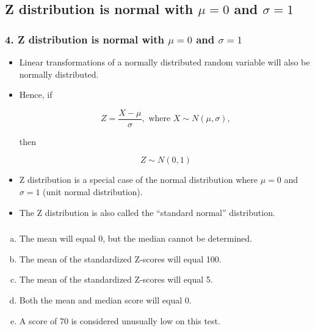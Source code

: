 \documentclass[11pt,containsverbatim,handout,xcolor=xelatex,dvipsnames,table]{beamer}
\newcommand{\solnMult}[1]{#1}
\begin{document}
\subsection{Z distribution is normal with $\mu = 0$ and $\sigma = 1$}
\label{mi4}


\begin{frame}
\frametitle{4. Z distribution is normal with $\mu = 0$ and $\sigma = 1$}

\begin{itemize}

\item Linear transformations of a normally distributed random variable will also be normally 
distributed.

\pause

\item Hence, if

\[ Z = \frac{X - \mu}{\sigma}, \text{ where } X \sim N(\mu, \sigma), \]

then

\[ Z \sim N(0,1) \]

\pause

\item Z distribution is a special case of the normal distribution where $\mu = 0$ and $\sigma = 1$ 
(unit normal distribution).

\pause

\item The Z distribution is also called the ``standard normal'' distribution.

\end{itemize}

\end{frame}


\begin{frame}
\frametitle{}


\begin{enumerate}[(a)]
\item The mean will equal 0, but the median cannot be determined.
\item The mean of the standardized Z-scores will equal 100.
\item The mean of the standardized Z-scores will equal 5.
\item \solnMult{Both the mean and median score will equal 0.}
\item A score of 70 is considered unusually low on this test.
\end{enumerate}

\end{frame}
\end{document}
